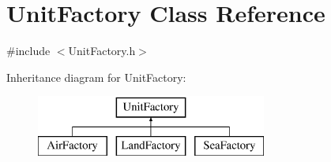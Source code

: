 \hypertarget{class_unit_factory}{}\section{Unit\+Factory Class Reference}
\label{class_unit_factory}


{\ttfamily \#include $<$Unit\+Factory.\+h$>$}

Inheritance diagram for Unit\+Factory\+:\begin{figure}[H]
\begin{center}
\leavevmode
\includegraphics[height=2.000000cm]{class_unit_factory}
\end{center}
\end{figure}
